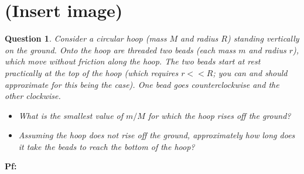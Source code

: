 \documentclass{article}
\newtheorem{question}{Question}
\begin{document}
\break

\section{(Insert image)}%
\begin{question}\label{q4}
    Consider a circular hoop (mass $M$ and radius $R$) standing vertically on the ground. Onto the hoop are threaded two beads (each mass $m$ and radius $r$), which move without friction along the hoop. The two beads start at rest practically at the top of the hoop (which requires $r<<R$; you can and should approximate for this being the case). One bead goes counterclockwise and the other clockwise.
    \begin{itemize}
        \item[(a)] What is the smallest value of $m/M$ for which the hoop rises off the ground?
        \item[(b)] Assuming the hoop does not rise off the ground, approximately how long does it take the beads to reach the bottom of the hoop? 
    \end{itemize}
\end{question}

\textbf{Pf:}
\end{document}
